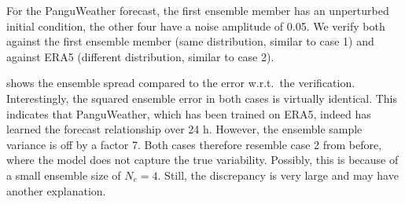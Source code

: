\documentclass[parskip=half,DIV=12,bookmarkpackage=false]{scrartcl}
\begin{document}
 For the PanguWeather forecast, the first ensemble member has an unperturbed initial condition, the other four have a noise amplitude of 0.05. We verify both against the first ensemble member (same distribution, similar to case 1) and against ERA5 (different distribution, similar to case 2).

  shows the ensemble spread compared to the error w.r.t.\ the verification. Interestingly, the squared ensemble error in both cases is virtually identical. This indicates that PanguWeather, which has been trained on ERA5, indeed has learned the forecast relationship over 24 h. However, the ensemble sample variance is off by a factor 7. Both cases therefore resemble case 2 from before, where the model does not capture the true variability. Possibly, this is because of a small ensemble size of $N_e = 4$. Still, the discrepancy is very large and may have another explanation.
 
\end{document}
